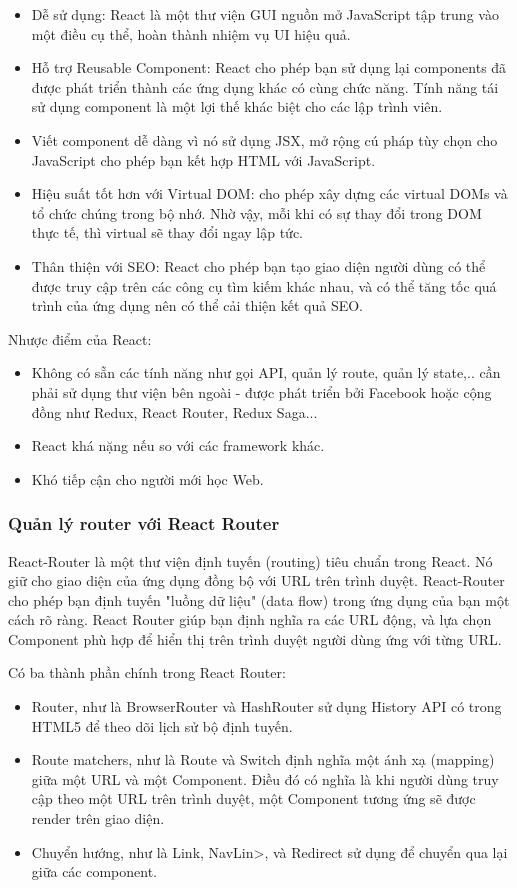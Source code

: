 \begin{itemize}
    \item Dễ sử dụng: React là một thư viện GUI nguồn mở JavaScript tập trung vào một điều cụ thể, hoàn thành nhiệm vụ UI hiệu quả.
    \item Hỗ trợ Reusable Component: React cho phép bạn sử dụng lại components đã được phát triển thành các ứng dụng khác có cùng chức năng. Tính năng tái sử dụng component là một lợi thế khác biệt cho các lập trình viên.
    \item Viết component dễ dàng vì nó sử dụng JSX, mở rộng cú pháp tùy chọn cho JavaScript cho phép bạn kết hợp HTML với JavaScript.
    \item Hiệu suất tốt hơn với Virtual DOM: cho phép xây dựng các virtual DOMs và tổ chức chúng trong bộ nhớ. Nhờ vậy, mỗi khi có sự thay đổi trong DOM thực tế, thì virtual sẽ thay đổi ngay lập tức.
    \item Thân thiện với SEO: React cho phép bạn tạo giao diện người dùng có thể được truy cập trên các công cụ tìm kiếm khác nhau, và có thể tăng tốc quá trình của ứng dụng nên có thể cải thiện kết quả SEO.
\end{itemize}
Nhược điểm của React:
\begin{itemize}
    \item Không có sẵn các tính năng như gọi API, quản lý route, quản lý state,.. cần phải sử dụng thư viện bên ngoài - được phát triển bởi Facebook hoặc
cộng đồng như Redux, React Router, Redux Saga...
    \item React khá nặng nếu so với các framework khác.
    \item Khó tiếp cận cho người mới học Web.
\end{itemize}

\subsubsection{Quản lý router với React Router}
React-Router là một thư viện định tuyến (routing) tiêu chuẩn trong React. Nó giữ cho giao diện của ứng dụng đồng bộ với URL trên trình duyệt. React-Router cho phép bạn định tuyến "luồng dữ liệu" (data flow) trong ứng dụng của bạn một cách rõ ràng. React Router giúp bạn định nghĩa ra các URL động, và lựa chọn Component phù hợp để hiển thị trên trình duyệt người dùng ứng với từng URL.\par
Có ba thành phần chính trong React Router:
\begin{itemize}
    \item Router, như là BrowserRouter và HashRouter sử dụng History API có trong HTML5 để theo dõi lịch sử bộ định tuyến.
    \item Route matchers, như là Route và Switch định nghĩa một ánh xạ (mapping) giữa một URL và một Component. Điều đó có nghĩa là khi người dùng truy cập theo một URL trên trình duyệt, một Component tương ứng sẽ được render trên giao diện.
    \item Chuyển hướng, như là Link, NavLin>, và Redirect sử dụng để chuyển qua lại giữa các component.
\end{itemize}


